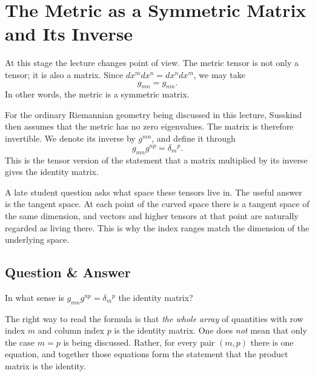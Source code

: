 \section{The Metric as a Symmetric Matrix and Its Inverse}

At this stage the lecture changes point of view. The metric tensor is not only a tensor; it is also a matrix. Since \(dx^m dx^n = dx^n dx^m\), we may take
\begin{equation}
g_{mn}=g_{nm}.
\end{equation}
In other words, the metric is a symmetric matrix.

For the ordinary Riemannian geometry being discussed in this lecture, Susskind then assumes that the metric has no zero eigenvalues. The matrix is therefore invertible. We denote its inverse by \(g^{mn}\), and define it through
\begin{equation}
g_{mn}g^{np}=\delta_m{}^p.
\end{equation}
This is the tensor version of the statement that a matrix multiplied by its inverse gives the identity matrix.

A late student question asks what space these tensors live in. The useful answer is the tangent space. At each point of the curved space there is a tangent space of the same dimension, and vectors and higher tensors at that point are naturally regarded as living there. This is why the index ranges match the dimension of the underlying space.

\subsection{Question \& Answer}

In what sense is \(g_{mn}g^{np}=\delta_m{}^p\) the identity matrix?

The right way to read the formula is that \emph{the whole array} of quantities with row index \(m\) and column index \(p\) is the identity matrix. One does \emph{not} mean that only the case \(m=p\) is being discussed. Rather, for every pair \((m,p)\) there is one equation, and together those equations form the statement that the product matrix is the identity.

